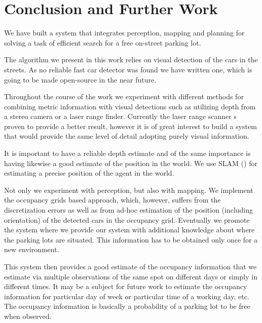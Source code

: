 
\chapter{Conclusion and Further Work} %
\label{cha:conclusion_and_further_work}

    We have built a system that integrates perception, mapping and planning
    for solving a task of efficient search for a free on-street parking lot.

    The algorithm we present in this work relies on visual detection of the
    cars in the streets. As no reliable fast car detector was found we have
    written one, which is going to be made open-source in the near future.

    Throughout the course of the work we experiment with different methods for
    combining metric information with visual detections such as utilizing
    depth from a stereo camera or a laser range finder. Currently the laser
    range scanner s proven to provide a better result, however it is of great
    interest to build a system that would provide the same level of detail
    adopting purely visual information.

    It is important to have a reliable depth estimate and of the same
    importance is having likewise a good estimate of the position in the
    world. We use SLAM
    (\cite{stachniss11isrr,kuemmerle11auro,kretzschmar10ki}) for estimating a
    precise position of the agent in the world.

    Not only we experiment with perception, but also with mapping. We
    implement the occupancy grids based approach, which, however, suffers from
    the discretization errors as well as from ad-hoc estimation of the
    position (including orientation) of the detected cars in the occupancy
    grid. Eventually we promote the system where we provide our system with
    additional knowledge about where the parking lots are situated. This
    information has to be obtained only once for a new environment.

    This system then provides a good estimate of the occupancy information
    that we estimate via multiple observations of the same spot on different
    days or simply in different times. It may be a subject for future work to
    estimate the occupancy information for particular day of week or
    particular time of a working day, etc. The occupancy information is
    basically a probability of a parking lot to be free when observed.

